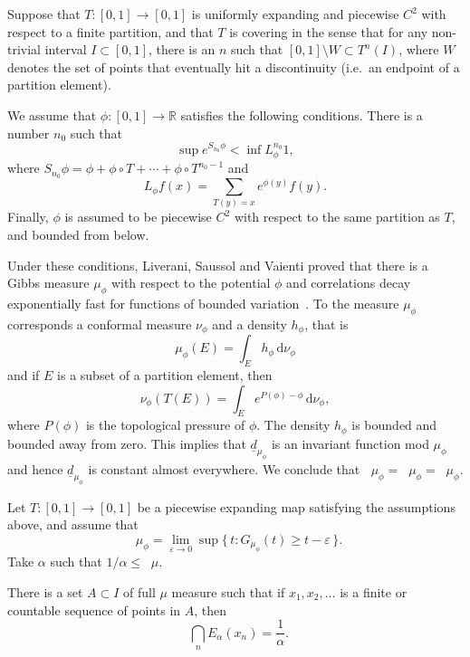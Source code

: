 \documentclass[10pt]{amsart}
\theoremstyle{definition}\newtheorem{defi}[theo]{Definition}\newtheorem{rema}[theo]{Remark}\newtheorem{exam}[theo]{Example}\newtheorem{exem}[theo]{Example}\newtheorem{nota}[theo]{Notation}
\DeclareMathOperator{\dimh}{dim_H}
\DeclareMathOperator{\ldimh}{\underline{dim}_H}
\DeclareMathOperator{\udimh}{\overline{dim}_H}
\newcommand*{\dd}{\mathrm{d}}
\begin{document}
Suppose that $T \colon [0,1] \to [0,1]$ is uniformly expanding and piecewise $C^2$ with respect to a finite partition, and that $T$ is covering in the sense that for any non-trivial interval $I \subset [0,1]$, there is an $n$ such that $[0,1] \setminus W \subset T^n (I)$, where $W$ denotes the set of points that eventually hit a discontinuity (i.e.\ an endpoint of a partition element).

We assume that $\phi \colon [0,1] \to \mathbb{R}$ satisfies the following conditions. There is a number $n_0$ such that
\[
\sup e^{S_{n_0} \phi} < \inf L_\phi^{n_0} 1,
\]
where $S_{n_0} \phi = \phi + \phi \circ T + \cdots + \phi \circ T^{n_0-1}$ and
\[
L_\phi f (x) = \sum_{T(y) = x} e^{\phi (y)} f(y).
\]
Finally, $\phi$ is assumed to be piecewise $C^2$ with respect to the same partition as $T$, and bounded from below.

Under these conditions, Liverani, Saussol and Vaienti proved that there is a Gibbs measure $\mu_\phi$ with respect to the potential $\phi$ and correlations decay exponentially fast for functions of bounded variation~\cite[Theorem~3.1]{liveranietal}. To the measure $\mu_\phi$ corresponds a conformal measure $\nu_\phi$ and a density $h_\phi$, that is
\[
\mu_\phi (E) = \int_E h_\phi \, \dd\nu_\phi
\]
and if $E$ is a subset of a partition element, then
\[
\nu_\phi (T(E)) = \int_E e^{P(\phi) - \phi} \, \dd \nu_\phi,
\]
where $P(\phi)$ is the topological pressure of $\phi$. The density $h_\phi$ is bounded and bounded away from zero. This implies that $\underline{d}_{\mu_\phi}$ is an invariant function mod $\mu_\phi$ and hence $\underline{d}_{\mu_\phi}$ is constant almost everywhere. We conclude that $\dimh \mu_\phi = \ldimh \mu_\phi = \udimh \mu_\phi$.

\begin{coro}\label{cor:piecewise}
Let $T \colon [0,1] \to [0,1]$ be a piecewise expanding map satisfying the assumptions above, and assume that
\begin{equation}\label{eq:dim-coarse}
\dimh \mu_\phi = \lim_{\varepsilon \to 0} \sup \{\, t : G_{\mu_\phi} (t) \geq t - \varepsilon \,\}.
\end{equation}
Take $\alpha$ such that $1/\alpha \leq \dimh \mu$.

There is a set $A \subset I$ of full $\mu$ measure such that if $x_1, x_2, \ldots$ is a finite or countable sequence of points in $A$, then
\[
\dimh \bigcap_n E_\alpha (x_n) = \frac{1}{\alpha}.
\]
\end{coro}
\end{document}
